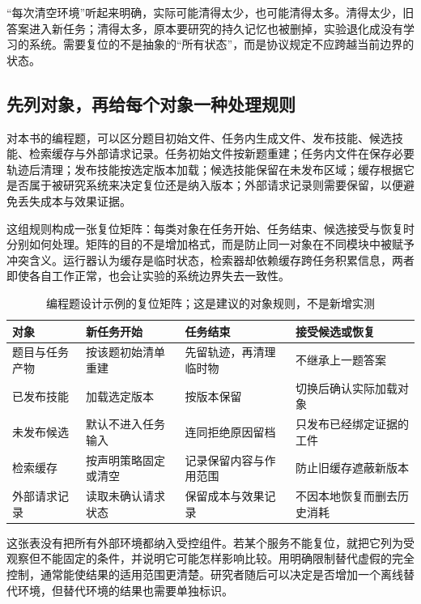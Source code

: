“每次清空环境”听起来明确，实际可能清得太少，也可能清得太多。清得太少，旧答案进入新任务；清得太多，原本要研究的持久记忆也被删掉，实验退化成没有学习的系统。需要复位的不是抽象的“所有状态”，而是协议规定不应跨越当前边界的状态。

\subsection{先列对象，再给每个对象一种处理规则}

对本书的编程题，可以区分题目初始文件、任务内生成文件、发布技能、候选技能、检索缓存与外部请求记录。任务初始文件按新题重建；任务内文件在保存必要轨迹后清理；发布技能按选定版本加载；候选技能保留在未发布区域；缓存根据它是否属于被研究系统来决定复位还是纳入版本；外部请求记录则需要保留，以便避免丢失成本与效果证据。

这组规则构成一张复位矩阵：每类对象在任务开始、任务结束、候选接受与恢复时分别如何处理。矩阵的目的不是增加格式，而是防止同一对象在不同模块中被赋予冲突含义。运行器认为缓存是临时状态，检索器却依赖缓存跨任务积累信息，两者即使各自工作正常，也会让实验的系统边界失去一致性。

\begin{table}[htbp]
\centering\small
\caption{编程题设计示例的复位矩阵；这是建议的对象规则，不是新增实测}
\label{tab:ch02-reset-matrix}
\begin{tabular}{>{\raggedright\arraybackslash}p{2.0cm}>{\raggedright\arraybackslash}p{4.0cm}>{\raggedright\arraybackslash}p{3.8cm}>{\raggedright\arraybackslash}p{4.0cm}}
\toprule
对象 & 新任务开始 & 任务结束 & 接受候选或恢复 \\
\midrule
题目与任务产物 & 按该题初始清单重建 & 先留轨迹，再清理临时物 & 不继承上一题答案 \\
已发布技能 & 加载选定版本 & 按版本保留 & 切换后确认实际加载对象 \\
未发布候选 & 默认不进入任务输入 & 连同拒绝原因留档 & 只发布已经绑定证据的工件 \\
检索缓存 & 按声明策略固定或清空 & 记录保留内容与作用范围 & 防止旧缓存遮蔽新版本 \\
外部请求记录 & 读取未确认请求状态 & 保留成本与效果记录 & 不因本地恢复而删去历史消耗 \\
\bottomrule
\end{tabular}
\end{table}

这张表没有把所有外部环境都纳入受控组件。若某个服务不能复位，就把它列为受观察但不能固定的条件，并说明它可能怎样影响比较。用明确限制替代虚假的完全控制，通常能使结果的适用范围更清楚。研究者随后可以决定是否增加一个离线替代环境，但替代环境的结果也需要单独标识。

